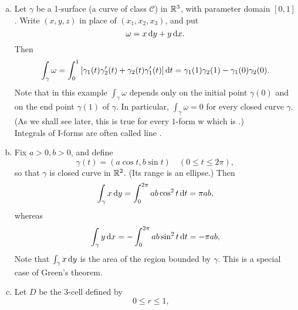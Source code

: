 \begin{newexample}
    \label{newexample:10.12}
    \begin{enumerate}[(a)]
        \item Let $\gamma$ be a 1-surface (a curve of class $\mathscr{C}$) in ${\protect\mathbb R}^3$, with parameter domain $[0, 1 ]$.
        Write $(x, y, z)$ in place of $(x_1, x_2 , x_3)$, and put
        \begin{equation*}
            \omega = x \d y + y \d x .
        \end{equation*}
        Then 
        \begin{equation*}
            \int_{\gamma} \omega = \int_{0}^{1} \left[ \gamma_1(t) \gamma'_2(t)+\gamma_2(t) \gamma'_1(t) \right] \d t = 
            \gamma_1(1)
            \gamma_2(1) -
            \gamma_1(0)
            \gamma_2(0) .
        \end{equation*}
        Note that in this example $\int_{\gamma} \omega$ depends only on the initial point $\gamma(0)$ and on the end point $\gamma(1)$ of $\gamma$. 
        In particular, $\int_{\gamma} \omega = 0$ for every closed curve $\gamma$. 
        (As we shall see later, this is true for every $1$-form w which is .) \\
        Integrals of I-forms are often called line .
        \item Fix $a>0,b>0$, and define 
        \begin{equation*}
            \gamma(t) = (a \cos t, b \sin t)
            \quad 
            (0 \leq t \leq 2\pi),
        \end{equation*}
        so that $\gamma$ is closed curve in ${\protect\mathbb R}^2$.
        (Its range is an ellipse.)
        Then 
        \begin{equation*}
            \int_{\gamma} x \d y =
            \int_{0}^{2\pi} ab \cos ^2 t \d t = 
            \pi ab,
        \end{equation*}
        whereas 
        \begin{equation*}
            \int_{\gamma} y \d x =
            -\int_{0}^{2\pi} ab \sin ^2 t \d t = 
            -\pi ab,
        \end{equation*}
        Note that $\int_{\gamma} x \d y$ is the area of the region bounded by $\gamma$. 
        This is a special case of Green's theorem.
        \item Let $D$ be the 3-cell defined by 
        \begin{equation*}
            0 \leq r \leq 1, 
            \quad

\end{equation*}
\end{enumerate}
\end{newexample}
